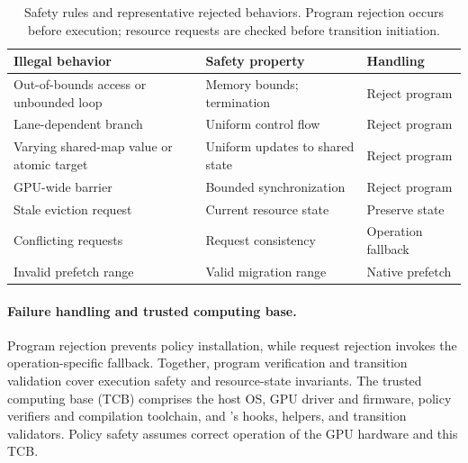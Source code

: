 \begin{table}[t]
\centering
\small
\begin{tabularx}{\columnwidth}{@{} >{\hsize=1.2\hsize\raggedright\arraybackslash}X >{\hsize=1.0\hsize\raggedright\arraybackslash}X >{\hsize=0.8\hsize\raggedright\arraybackslash}X @{}}
\toprule
\textbf{Illegal behavior} & \textbf{Safety property} & \textbf{Handling} \\
\midrule
Out-of-bounds access or unbounded loop & Memory bounds; termination & Reject program \\
Lane-dependent branch & Uniform control flow & Reject program \\
Varying shared-map value or atomic target & Uniform updates to shared state & Reject program \\
GPU-wide barrier & Bounded synchronization & Reject program \\
Stale eviction request & Current resource state & Preserve state \\
Conflicting requests & Request consistency & Operation fallback \\
Invalid prefetch range & Valid migration range & Native prefetch \\
\bottomrule
\end{tabularx}
\caption{Safety rules and representative rejected behaviors. Program rejection occurs before execution; resource requests are checked before transition initiation.}
\label{tab:safety-rules}
\end{table}

\paragraph{Failure handling and trusted computing base.}
Program rejection prevents policy installation, while request rejection invokes the operation-specific fallback.
Together, program verification and transition validation cover execution safety and resource-state invariants.
The trusted computing base (TCB) comprises the host OS, GPU driver and firmware, policy verifiers and compilation toolchain, and \sys{}'s hooks, helpers, and transition validators.
Policy safety assumes correct operation of the GPU hardware and this TCB.

